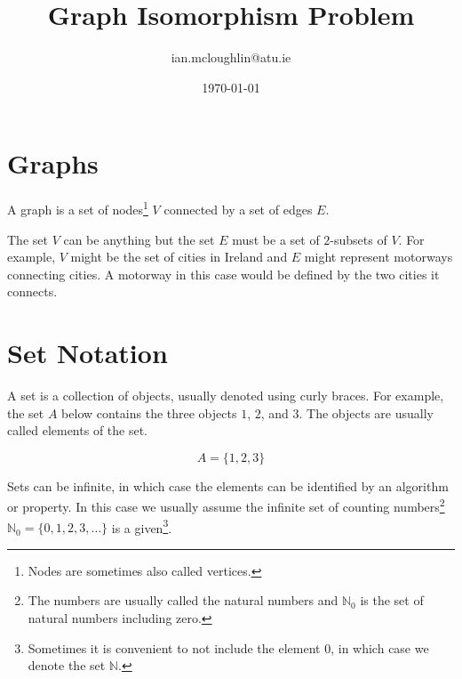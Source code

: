 \documentclass{iansnotes}
\title{Graph Isomorphism Problem}
\author{ian.mcloughlin@atu.ie}
\date{\today}
\begin{document}
\maketitle


\section{Graphs}
  
  A graph\autocite[10]{sipser} is a set of nodes\footnote{Nodes are sometimes also called vertices.} $V$ connected by a set of edges $E$.

  \begin{figure}
    \center
    \end{figure}

  The set $V$ can be anything but the set $E$ must be a set of $2$-subsets of $V$.
  For example, $V$ might be the set of cities in Ireland and $E$ might represent motorways connecting cities.
  A motorway in this case would be defined by the two cities it connects.

\section{Set Notation}
  A set is a collection of objects, usually denoted using curly braces\autocite[3]{sipser}.
  For example, the set $A$ below contains the three objects $1$, $2$, and $3$.
  The objects are usually called elements of the set.

  $$ A = \{ 1, 2, 3 \} $$

  Sets can be infinite, in which case the elements can be identified by an algorithm or property.
  In this case we usually assume the infinite set of counting numbers\footnote{The numbers are usually called the natural numbers and $\mathbb{N}_0$ is the set of natural numbers including zero.} $\mathbb{N}_0 = \{ 0, 1, 2, 3, \ldots \}$ is a given\footnote{Sometimes it is convenient to not include the element $0$, in which case we denote the set $\mathbb{N}$.}.
\end{document}
